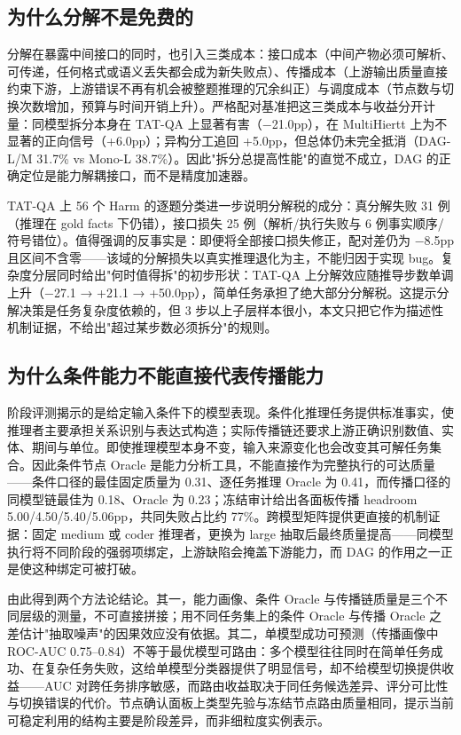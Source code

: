 \subsection{为什么分解不是免费的}\label{sec:5-1}
分解在暴露中间接口的同时，也引入三类成本：接口成本（中间产物必须可解析、可传递，任何格式或语义丢失都会成为新失败点）、传播成本（上游输出质量直接约束下游，上游错误不再有机会被整题推理的冗余纠正）与调度成本（节点数与切换次数增加，预算与时间开销上升）。严格配对基准把这三类成本与收益分开计量：同模型拆分本身在 TAT-QA 上显著有害（−21.0pp），在 MultiHiertt 上为不显著的正向信号（+6.0pp）；异构分工追回 +5.0pp，但总体仍未完全抵消（DAG-L/M 31.7\% vs Mono-L 38.7\%）。因此"拆分总提高性能"的直觉不成立，DAG 的正确定位是能力解耦接口，而不是精度加速器。

TAT-QA 上 56 个 Harm 的逐题分类进一步说明分解税的成分：真分解失败 31 例（推理在 gold facts 下仍错），接口损失 25 例（解析/执行失败与 6 例事实顺序/符号错位）。值得强调的反事实是：即便将全部接口损失修正，配对差仍为 −8.5pp 且区间不含零——该域的分解损失以真实推理退化为主，不能归因于实现 bug。复杂度分层同时给出"何时值得拆"的初步形状：TAT-QA 上分解效应随推导步数单调上升（−27.1 → +21.1 → +50.0pp），简单任务承担了绝大部分分解税。这提示分解决策是任务复杂度依赖的，但 3 步以上子层样本很小，本文只把它作为描述性机制证据，不给出"超过某步数必须拆分"的规则。

\subsection{为什么条件能力不能直接代表传播能力}\label{sec:5-2}
阶段评测揭示的是给定输入条件下的模型表现。条件化推理任务提供标准事实，使推理者主要承担关系识别与表达式构造；实际传播链还要求上游正确识别数值、实体、期间与单位。即使推理模型本身不变，输入来源变化也会改变其可解任务集合。因此条件节点 Oracle 是能力分析工具，不能直接作为完整执行的可达质量——条件口径的最佳固定质量为 0.31、逐任务推理 Oracle 为 0.41，而传播口径的同模型链最佳为 0.18、Oracle 为 0.23；冻结审计给出各面板传播 headroom 5.00/4.50/5.40/5.06pp，共同失败占比约 77\%。跨模型矩阵提供更直接的机制证据：固定 medium 或 coder 推理者，更换为 large 抽取后最终质量提高——同模型执行将不同阶段的强弱项绑定，上游缺陷会掩盖下游能力，而 DAG 的作用之一正是使这种绑定可被打破。

由此得到两个方法论结论。其一，能力画像、条件 Oracle 与传播链质量是三个不同层级的测量，不可直接拼接；用不同任务集上的条件 Oracle 与传播 Oracle 之差估计"抽取噪声"的因果效应没有依据。其二，单模型成功可预测（传播画像中 ROC-AUC 0.75–0.84）不等于最优模型可路由：多个模型往往同时在简单任务成功、在复杂任务失败，这给单模型分类器提供了明显信号，却不给模型切换提供收益——AUC 对跨任务排序敏感，而路由收益取决于同任务候选差异、评分可比性与切换错误的代价。节点确认面板上类型先验与冻结节点路由质量相同，提示当前可稳定利用的结构主要是阶段差异，而非细粒度实例表示。

